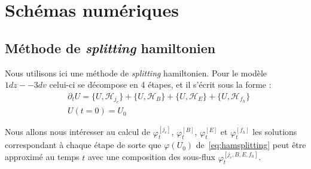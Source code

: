 
\section{Schémas numériques}
\label{sec:3:scheme}

\subsection{Méthode de \emph{splitting} hamiltonien}

Nous utilisons ici une méthode de \emph{splitting} hamiltonien. Pour le modèle $1dz -- 3dv$ celui-ci se décompose en 4 étapes, et il s'écrit sous la forme :
\begin{equation}
  \begin{aligned}
    & \partial_t U = \{ U,\mathcal{H}_{j_c}\} + \{ U,\mathcal{H}_B\} + \{ U,\mathcal{H}_E\} + \{ U,\mathcal{H}_{f_h}\} \\
    & U(t=0) = U_0
  \end{aligned}
  \label{eq:hamsplitting}
\end{equation}

Nous allons nous intéresser au calcul de $\varphi_t^{[j_c]}$, $\varphi_t^{[B]}$, $\varphi_t^{[E]}$ et $\varphi_t^{[f_h]}$ les solutions correspondant à chaque étape de sorte que $\varphi(U_0)$ de~\eqref{eq:hamsplitting} peut être approximé au temps $t$ avec une composition des sous-flux $\varphi_t^{[j_c,B,E,f_h]}$.

